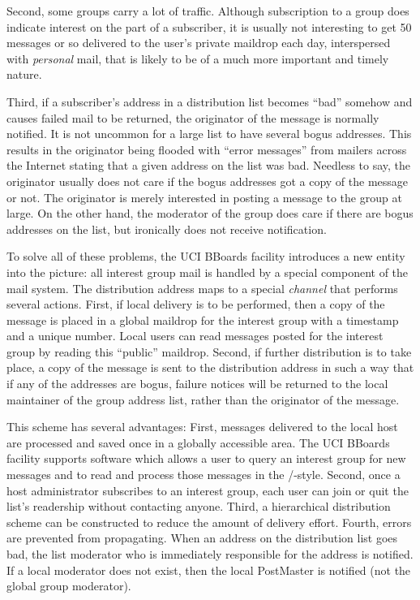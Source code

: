 Second,
some groups carry a lot of traffic.
Although subscription to a group does indicate interest on the part of a
subscriber,
it is usually not interesting to get 50 messages or so delivered to 
the user's private maildrop each day,
interspersed with {\it personal} mail,
that is likely to be of a much more important and timely nature.

Third, if a subscriber's address in a distribution list 
becomes ``bad'' somehow and causes failed mail to be returned,
the originator of the message is normally notified.
It is not uncommon for a large list to have several bogus addresses.
This results in the originator being flooded with ``error messages'' from
mailers across the Internet stating that a given address on the list was
bad.
Needless to say,
the originator usually does not care if the bogus addresses got a copy
of the message or not.
The originator is merely interested in posting a message
to the group at large.
On the other hand,
the moderator of the group does care if there are bogus addresses on the list,
but ironically does not receive notification.

To solve all of these problems,
the UCI BBoards facility introduces a new entity into the picture:
all interest group mail is handled by a special component of the mail system.
The distribution address maps to a special {\it channel} that performs
several actions.
First, if local delivery is to be performed,
then a copy of the message is placed in a global maildrop for the interest
group with a timestamp and a unique number.
Local users can read messages posted for the interest group by reading this
``public'' maildrop.
Second, if further distribution is to take place,
a copy of the message is sent to the distribution address in such a way that
if any of the addresses are bogus,
failure notices will be returned to the local maintainer of the group
address list, rather than the originator of the message.

This scheme has several advantages:
First, messages delivered to the local host are processed and saved once
in a globally accessible area.
The UCI BBoards facility supports software which allows a user to query an
interest group for new messages and to read and process
those messages in the \MH/-style.
Second, once a host administrator subscribes to an interest group,
each user can join or quit the list's readership without
contacting anyone.
Third, a hierarchical distribution scheme can be constructed to
reduce the amount of delivery effort.
Fourth, errors are prevented from propagating.
When an address on the distribution list goes bad,
the list moderator who is immediately responsible for the address is notified.
If a local moderator does not exist,
then the local PostMaster is notified (not the global group moderator).

